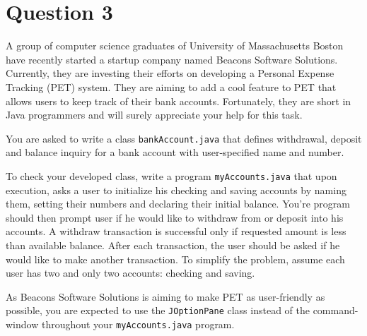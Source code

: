 \documentclass[12pt,letterpaper,twoside]{article}
\begin{document}
\section*{Question 3}

A group of computer science graduates of University of Massachusetts Boston have recently started a startup company named Beacons Software Solutions.
Currently, they are investing their efforts on developing a Personal Expense Tracking (PET) system.
They are aiming to add a cool feature to PET that allows users to keep track of their bank accounts.
Fortunately, they are short in Java programmers and will surely appreciate your help for this task.

You are asked to write a class \texttt{bankAccount.java} that defines withdrawal, deposit and balance inquiry for a bank account with user-specified name and number.

To check your developed class, write a program \texttt{myAccounts.java} that upon execution, asks a user to initialize his checking and saving accounts by naming them, setting their numbers and declaring their initial balance.
You're program should then prompt user if he would like to withdraw from or deposit into his accounts.
A withdraw transaction is successful only if requested amount is less than available balance.
After each transaction, the user should be asked if he would like to make another transaction.
To simplify the problem, assume each user has two and only two accounts: checking and saving.

As Beacons Software Solutions is aiming to make PET as user-friendly as possible, you are expected to use the \texttt{JOptionPane} class instead of the command-window throughout your \texttt{myAccounts.java} program.

\end{document}
